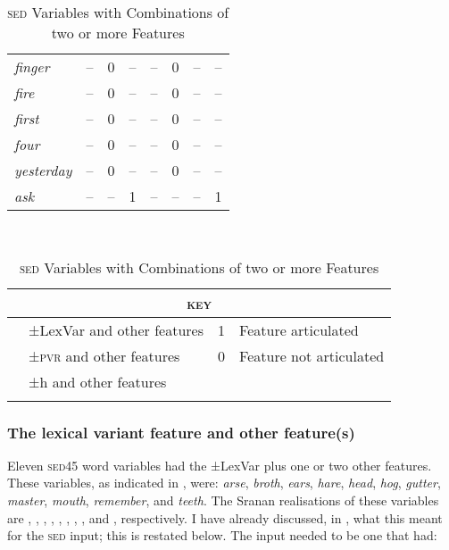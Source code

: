 {{{{{{{{{\begin{table}
\begin{tabularx}{.9\textwidth}{Xccccccc}
\emph{finger}\cellcolor{blue!35}  &\cellcolor{blue!35}  -- & \cellcolor{blue!35} 0 & \cellcolor{blue!35} -- &\cellcolor{blue!35}  -- & \cellcolor{blue!35} 0  & -- & --  \\   
\emph{fire} \cellcolor{blue!35}  &\cellcolor{blue!35}  -- & \cellcolor{blue!35} 0 & \cellcolor{blue!35} -- &\cellcolor{blue!35}  -- & \cellcolor{blue!35} 0  & -- & --  \\  
\emph{first} \cellcolor{blue!35}  &\cellcolor{blue!35}  -- & \cellcolor{blue!35} 0 & \cellcolor{blue!35} -- &\cellcolor{blue!35}  -- & \cellcolor{blue!35} 0  & -- & --  \\  
\emph{four} \cellcolor{blue!35}  &\cellcolor{blue!35}  -- & \cellcolor{blue!35} 0 & \cellcolor{blue!35} -- &\cellcolor{blue!35}  -- & \cellcolor{blue!35} 0  & -- & --  \\   
\emph{yesterday} \cellcolor{blue!35}  &\cellcolor{blue!35}  -- & \cellcolor{blue!35} 0 & \cellcolor{blue!35} -- &\cellcolor{blue!35}  -- & \cellcolor{blue!35} 0  & -- & --  \\    
\emph{ask} \cellcolor{orange!35} & \cellcolor{orange!35}-- & \cellcolor{orange!35}-- & \cellcolor{orange!35}1 & \cellcolor{orange!35}-- & \cellcolor{orange!35}--  & \cellcolor{orange!35}-- & \cellcolor{orange!35}1  \\  
\midrule
\end{tabularx}\\
\begin{tabularx}{.9\textwidth}{lXll}
\multicolumn{4}{c}{\scshape key}\\\midrule
\cellcolor{green!35} & {±LexVar and other features} &  {{1}} & Feature articulated  \\
\cellcolor{blue!35} & {±\textsc{pvr} and other features} &  {{0}} & Feature not articulated \\
\cellcolor{orange!35} & {±h and other features} \\
\lspbottomrule 
\end{tabularx}
\caption{\textsc{sed} Variables with Combinations of two or more Features}
\label{Table 3.8}
\end{table}

\subsubsection {The lexical variant feature and other feature(s)}
Eleven \textsc{sed45} word variables had the ±LexVar plus one or two other features. These variables, as indicated in , were: \emph{arse}, \emph{broth}, \emph{ears}, \emph{hare}, \emph{head}, \emph{hog}, \emph{gutter}, \emph{master}, \emph{mouth}, \emph{remember}, and \emph{teeth}. The Sranan realisations of these variables are \textipa{[ras]}, \textipa{[brafu]}, \textipa{[jesi]}, \textipa{[he]}, \textipa{[hedi]}, \textipa{[hog]}, \textipa{[gotro]}, \textipa{[masra]}, \textipa{[memere]} and \textipa{[tifi]}, respectively. I have already discussed, in  , what this meant for the \textsc{sed} input; this is restated below. The input needed to be one that had:

}}}}}}}}}
